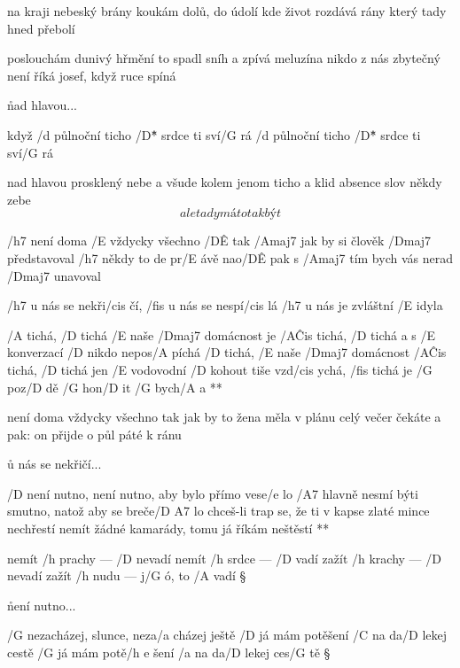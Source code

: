 na kraji nebeský brány
koukám dolů, do údolí
kde život rozdává rány
který tady hned přebolí \s

poslouchám dunivý hřmění
to spadl sníh a zpívá meluzína
nikdo z nás zbytečný není
říká josef, když ruce spíná \songgg

\r nad hlavou...

když /d půlnoční ticho /D\^{*} srdce ti sví/G rá
/d půlnoční ticho /D\^{*} srdce ti sví/G rá

\rr

nad hlavou prosklený nebe
a všude kolem jenom ticho a klid
absence slov někdy zebe
\[ ale tady má to tak být \]




/h7 není doma /E vždycky všechno /D\^E tak
/Amaj7 jak by si člověk /Dmaj7 představoval
/h7 někdy to de pr/E ávě nao/D\^E pak
s /Amaj7 tím bych vás nerad /Dmaj7 unavoval

\R  /h7 u nás se nekři/cis čí, /fis u nás se nespí/cis lá
    /h7 u nás je zvláštní /E idyla

    /A tichá, /D tichá /E naše /Dmaj7 domácnost je /A\^{Cis} tichá, /D tichá
    a s /E konverzací /D nikdo nepos/A píchá
    /D tichá, /E naše /Dmaj7 domácnost /A\^{Cis} tichá, /D tichá
    jen /E vodovodní /D kohout tiše vzd/cis ychá, /fis tichá
    je /G poz/D dě /G hon/D it /G bych/A a **

není doma vždycky všechno tak
jak by to žena měla v plánu
celý večer čekáte a pak:
on přijde o půl páté k ránu

\r u nás se nekřičí...




\R  /D není nutno, není nutno, aby bylo přímo vese/e lo
    /A7 hlavně nesmí býti smutno, natož aby se breče/{D A7} lo \s
    chceš-li trap se, že ti v kapse zlaté mince nechřestí
    nemít žádné kamarády, tomu já říkám neštěstí **

nemít /h prachy --- /D nevadí
nemít /h srdce --- /D vadí
zažít /h krachy --- /D nevadí
zažít /h nudu --- j/G ó, to /A vadí \S

\r není nutno...




/G nezacházej, slunce, neza/a cházej ještě
/D já mám potěšení /C na da/D lekej cestě
/G já mám potě/{h e} šení    /a na da/D lekej ces/G tě \S

